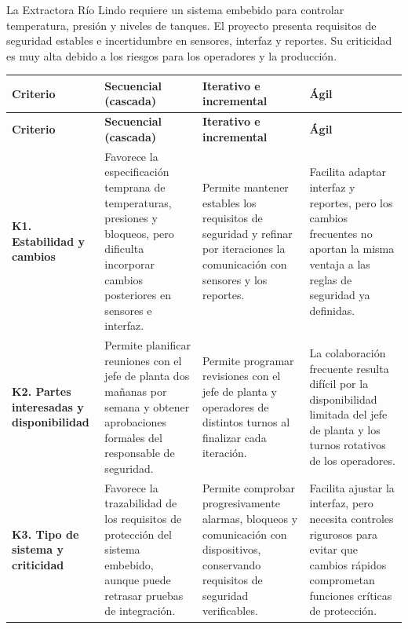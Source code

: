 \documentclass[12pt,a4paper]{article}
\begin{document}
La Extractora Río Lindo requiere un sistema embebido
para controlar temperatura, presión y niveles de
tanques. El proyecto presenta requisitos de seguridad
estables e incertidumbre en sensores, interfaz y
reportes. Su criticidad es muy alta debido a los
riesgos para los operadores y la producción.

\begingroup
\footnotesize
\setlength{\tabcolsep}{4pt}
\renewcommand{\arraystretch}{1.24}
\setlength{\LTleft}{0pt}
\setlength{\LTright}{0pt}

\begin{longtable}{|>{\raggedright\arraybackslash}p{}|>{\raggedright\arraybackslash}p{}|>{\raggedright\arraybackslash}p{}|>{\raggedright\arraybackslash}p{}|}
\hline
\textbf{Criterio} &
\textbf{Secuencial (cascada)} &
\textbf{Iterativo e incremental} &
\textbf{Ágil} \\
\hline
\endfirsthead

\hline
\textbf{Criterio} &
\textbf{Secuencial (cascada)} &
\textbf{Iterativo e incremental} &
\textbf{Ágil} \\
\hline
\endhead

\textbf{K1. Estabilidad y cambios} &
Favorece la especificación temprana de temperaturas,
presiones y bloqueos, pero dificulta incorporar
cambios posteriores en sensores e interfaz. &
Permite mantener estables los requisitos de seguridad
y refinar por iteraciones la comunicación con sensores
y los reportes. &
Facilita adaptar interfaz y reportes, pero los cambios
frecuentes no aportan la misma ventaja a las reglas
de seguridad ya definidas. \\
\hline

\textbf{K2. Partes interesadas y disponibilidad} &
Permite planificar reuniones con el jefe de planta
dos mañanas por semana y obtener aprobaciones
formales del responsable de seguridad. &
Permite programar revisiones con el jefe de planta
y operadores de distintos turnos al finalizar
cada iteración. &
La colaboración frecuente resulta difícil por la
disponibilidad limitada del jefe de planta y los
turnos rotativos de los operadores. \\
\hline

\textbf{K3. Tipo de sistema y criticidad} &
Favorece la trazabilidad de los requisitos de
protección del sistema embebido, aunque puede
retrasar pruebas de integración. &
Permite comprobar progresivamente alarmas, bloqueos
y comunicación con dispositivos, conservando
requisitos de seguridad verificables. &
Facilita ajustar la interfaz, pero necesita controles
rigurosos para evitar que cambios rápidos comprometan
funciones críticas de protección. \\
\hline


\end{longtable}
\end{document}
